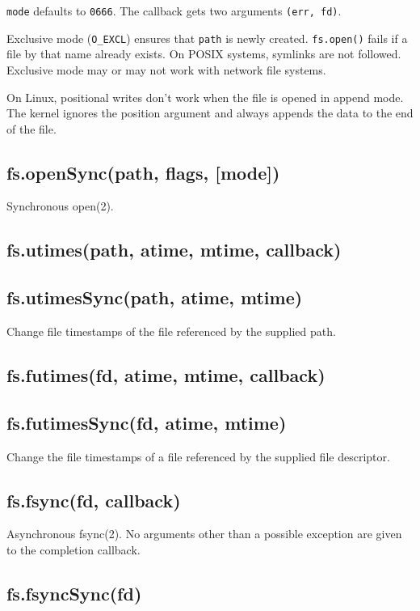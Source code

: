 \texttt{mode} defaults to \texttt{0666}. The callback gets two arguments
\texttt{(err, fd)}.

Exclusive mode (\texttt{O\_EXCL}) ensures that \texttt{path} is newly
created. \texttt{fs.open()} fails if a file by that name already exists.
On POSIX systems, symlinks are not followed. Exclusive mode may or may
not work with network file systems.

On Linux, positional writes don't work when the file is opened in append
mode. The kernel ignores the position argument and always appends the
data to the end of the file.

\subsection{fs.openSync(path, flags, {[}mode{]})}

Synchronous open(2).

\subsection{fs.utimes(path, atime, mtime, callback)}

\subsection{fs.utimesSync(path, atime, mtime)}

Change file timestamps of the file referenced by the supplied path.

\subsection{fs.futimes(fd, atime, mtime, callback)}

\subsection{fs.futimesSync(fd, atime, mtime)}

Change the file timestamps of a file referenced by the supplied file
descriptor.

\subsection{fs.fsync(fd, callback)}

Asynchronous fsync(2). No arguments other than a possible exception are
given to the completion callback.

\subsection{fs.fsyncSync(fd)}

